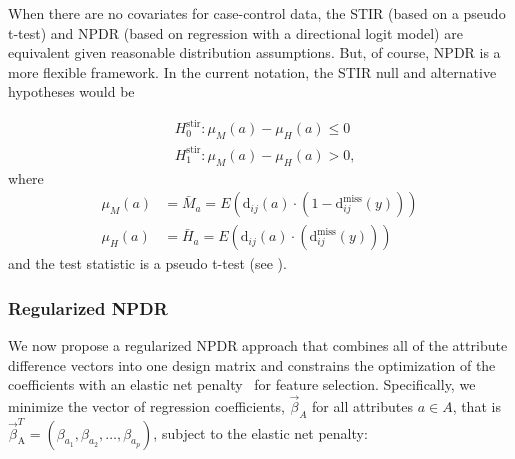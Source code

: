 \documentclass[10pt]{article}
\begin{document}
When there are no covariates for case-control data, the STIR (based on a pseudo t-test) and NPDR (based on regression with a directional logit model) are equivalent given reasonable distribution assumptions. But, of course, NPDR is a more flexible framework. In the current notation, the STIR null and alternative hypotheses would be


\begin{equation}
\begin{aligned}
    & H^{\text{stir}}_0: \mu_M(a) - \mu_H(a) \le 0 \\
    & H^{\text{stir}}_1: \mu_M(a) - \mu_H(a) > 0,
\end{aligned}
\end{equation}  
where
\begin{equation}
\begin{aligned}
    \mu_M(a) & = \bar{M}_a = E \left( \text{d}_{ij}(a) \cdot \left( 1-\text{d}^{\text{miss}}_{ij}(y) \right) \right) \\
    \mu_H(a) & = \bar{H}_a = E \left( \text{d}_{ij}(a) \cdot \left( \text{d}^{\text{miss}}_{ij}(y) \right) \right)
\end{aligned}
\end{equation}  
and the test statistic is a pseudo t-test (see \cite{stir}).

\subsubsection{Regularized NPDR}

We now propose a regularized NPDR approach that combines all of the attribute difference vectors into one design matrix and constrains the optimization of the coefficients with an elastic net penalty~\cite{glmnet05} for feature selection.
Specifically, we minimize the vector of regression coefficients, $ \vec{\beta}_A$ for all attributes $a \in A$, that is $\vec{\beta}^{T}_{\text{A}} = (\beta_{a_1}, \beta_{a_2}, \ldots, \beta_{a_p})$, subject to the elastic net penalty: 
\end{document}
